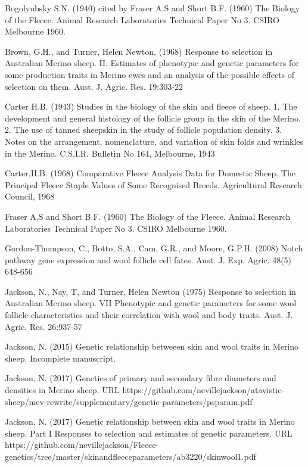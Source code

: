 \documentclass[titlepage]{article}  %
\begin{document}
\clearpage
\begin{thebibliography}{99}

 Bogolyubsky S.N. (1940) cited by Fraser A.S and Short B.F. (1960) The Biology of the Fleece. Animal Research Laboratories Technical Paper No 3. CSIRO Melbourne 1960.

Brown, G.H., and Turner, Helen Newton. (1968) Response to selection in Australian Merino sheep. II. Estimates of phenotypic and genetic parameters for some production traits in Merino ewes and an analysis of the possible effects of selection on them. Aust. J. Agric. Res. 19:303-22

Carter H.B. (1943) Studies in the biology of the skin and fleece of sheep. 1. The development and general histology of the follicle group in the skin of the Merino. 2. The use of tanned sheepskin in the study of follicle population density. 3. Notes on the arrangement, nomenclature, and variation of skin folds and wrinkles in the Merino. C.S.I.R. Bulletin No 164, Melbourne, 1943

Carter,H.B. (1968) Comparative Fleece Analysis Data for Domestic Sheep. The Principal Fleece Staple Values of Some Recognised Breeds. Agricultural Research Council, 1968

Fraser A.S and Short B.F. (1960) The Biology of the Fleece. Animal Research Laboratories Technical Paper No 3. CSIRO Melbourne 1960.

Gordon-Thompson, C., Botto, S.A., Cam, G.R., and Moore, G.P.H. (2008) Notch pathway gene expression and wool follicle cell fates. Aust. J. Exp. Agric. 48(5) 648-656

Jackson, N., Nay, T, and Turner, Helen Newton (1975) Response to selection in Australian Merino sheep. VII Phenotypic and genetic parameters for some wool follicle characteristics and their correlation with wool and body traits. Aust. J. Agric. Res. 26:937-57

Jackson, N. (2015) Genetic relationship betweeen skin and wool traits in Merino sheep. Incomplete manuscript.

Jackson, N. (2017) Genetics of primary and secondary fibre diameters and densities in Merino sheep. URL https://github.com/nevillejackson/atavistic-sheep/mev-rewrite/supplementary/genetic-parameters/psparam.pdf

Jackson, N. (2017) Genetic relationship between skin and wool traits in Merino sheep. Part I Responses to selection and estimates of genetic parameters. URL https://github.com/nevillejackson/Fleece-genetics/tree/master/skinandfleeceparameters/ab3220/skinwool1.pdf


\end{thebibliography}
\end{document}
